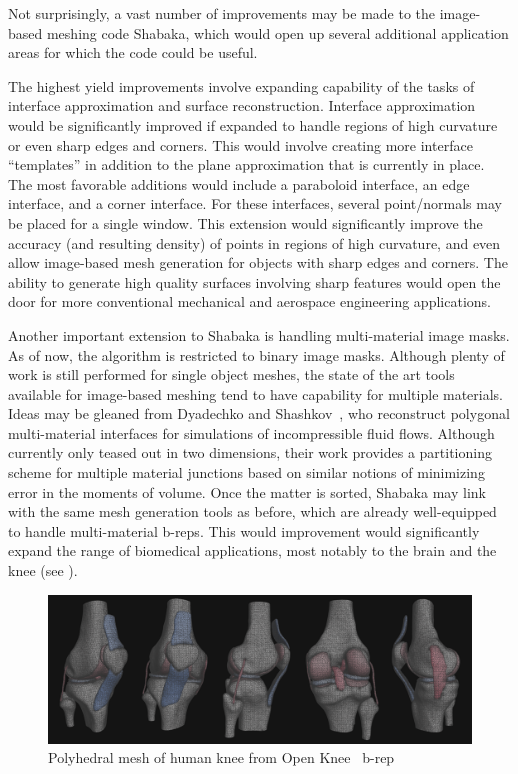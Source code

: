 Not surprisingly, a vast number of improvements may be made to the image-based meshing code Shabaka, which would open up several additional application areas for which the code could be useful.

The highest yield improvements involve expanding capability of the tasks of interface approximation and surface reconstruction. Interface approximation would be significantly improved if expanded to handle regions of high curvature or even sharp edges and corners. This would involve creating more interface ``templates'' in addition to the plane approximation that is currently in place. The most favorable additions would include a paraboloid interface, an edge interface, and a corner interface. For these interfaces, several point/normals may be placed for a single window. This extension would significantly improve the accuracy (and resulting density) of points in regions of high curvature, and even allow image-based mesh generation for objects with sharp edges and corners. The ability to generate high quality surfaces involving sharp features would open the door for more conventional mechanical and aerospace engineering applications.

Another important extension to Shabaka is handling multi-material image masks. As of now, the algorithm is restricted to binary image masks. Although plenty of work is still performed for single object meshes, the state of the art tools available for image-based meshing tend to have capability for multiple materials. Ideas may be gleaned from Dyadechko and Shashkov~\cite{dyadechko_2008}, who reconstruct polygonal multi-material interfaces for simulations of incompressible fluid flows. Although currently only teased out in two dimensions, their work provides a partitioning scheme for multiple material junctions based on similar notions of minimizing error in the moments of volume. Once the matter is sorted, Shabaka may link with the same mesh generation tools as before, which are already well-equipped to handle multi-material b-reps. This would improvement would significantly expand the range of biomedical applications, most notably to the brain and the knee (see ).

\begin{figure}
\centering
		\includegraphics[width=1.0\textwidth]{media/7-polyknee/fullmesh.png}
%
\caption{Polyhedral mesh of human knee from Open Knee~\cite{erdemir_2015} b-rep}
\label{fig:polyknee}
\end{figure}

